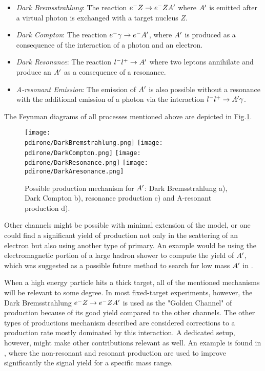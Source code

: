 \begin{itemize}
\item \textit{Dark Bremsstrahlung}: The reaction $e^- Z \to e^- Z A'$ where $A'$ is emitted after a virtual photon is exchanged with a target nucleus $Z$.
\item \textit{Dark Compton}: The reaction $e^- \gamma \to e^- A'$, where $A'$ is produced as a consequence of the interaction of a photon and an electron.
\item \textit{Dark Resonance}: The reaction $l^- l^+ \to A'$ where two leptons annihilate and produce an $A'$ as a consequence of a resonance.
\item \textit{A-resonant Emission}: The emission of $A'$ is also possible without a resonance with the additional emission of a photon via the interaction $l^- l^+ \to A' \gamma$.
\end{itemize}

The Feynman diagrams of all processes mentioned above are depicted in Fig.\ref{fig:dm-production-mechanism}.

\begin{figure}
\centering
\texttt{[image: \\pdirone/DarkBremstrahlung.png]}
\texttt{[image: \\pdirone/DarkCompton.png]}
\texttt{[image: \\pdirone/DarkResonance.png]}
\texttt{[image: \\pdirone/DarkAresonance.png]}
\caption{Possible production mechanism for $A'$: Dark Bremsstrahlung a), Dark Compton b), resonance production c) and A-resonant production d).}
\label{fig:dm-production-mechanism}
\end{figure}

Other channels might be possible with minimal extension of the model, or one could find a significant yield of production not only in the scattering of an electron but also using another type of primary. An example would be using the electromagnetic portion of a large hadron shower to compute the yield of $A'$, which was suggested as a possible future method to search for low mass $A'$ in \cite{Celentano:2020vtu}.

When a high energy particle hits a thick target, all of the mentioned mechanisms will be relevant to some degree.
In most fixed-target experiments, however, the Dark Bremsstrahlung $e^- Z \to e^- Z A'$ is used as the "Golden Channel" of production because of its good yield compared to the other channels. The other types of productions mechanism described are considered corrections to a production rate mostly dominated by this interaction. A dedicated setup, however, might make other contributions relevant as well. An example is found in \cite{Marsicano_2018}, where the non-resonant and resonant production are used to improve significantly the signal yield for a specific mass range.


